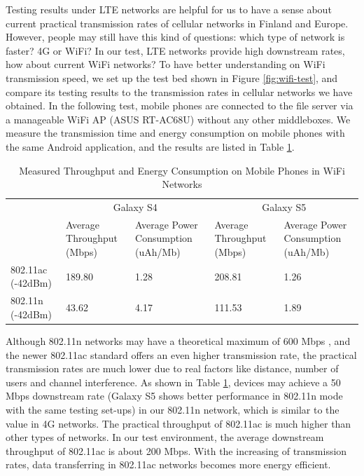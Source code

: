 \documentclass[english]{tktltiki}
\begin{document}
Testing results under LTE networks are helpful for us to have a sense about current practical transmission rates of cellular networks in Finland and Europe. However, people may still have this kind of questions: which type of network is faster? 4G or WiFi? In our test, LTE networks provide high downstream rates, how about current WiFi networks? To have better understanding on WiFi transmission speed, we set up the test bed shown in Figure \ref{fig:wifi-test}, and compare its testing results to the transmission rates in cellular networks we have obtained. In the following test, mobile phones are connected to the file server via a manageable WiFi AP (ASUS RT-AC68U) without any other middleboxes. We measure the transmission time and energy consumption on mobile phones with the same Android application, and the results are listed in Table \ref{tab:wifi-speed}.

\begin{table}[htbp]
\centering
\begin{tabular}{|p{110pt}|p{50pt}|p{75pt}|p{50pt}|p{75pt}|}
  \hline
  & \multicolumn{2}{c|}{Galaxy S4} & \multicolumn{2}{c|}{Galaxy S5}\\
  \cline{2-5}
  & Average Throughput (Mbps) & Average Power Consumption (uAh/Mb) & Average Throughput (Mbps) & Average Power Consumption (uAh/Mb) \\
  \hline
  802.11ac (-42dBm\footnotemark[8]) & 189.80 & 1.28 & 208.81 & 1.26 \\
  \hline
  802.11n (-42dBm\footnotemark[8]) & 43.62 & 4.17 & 111.53 & 1.89 \\
  \hline
\end{tabular}
\caption{Measured Throughput and Energy Consumption on Mobile Phones in WiFi Networks}
\label{tab:wifi-speed}
\end{table}



Although 802.11n networks may have a theoretical maximum of 600 Mbps \cite{80211n}, and the newer 802.11ac standard offers an even higher transmission rate, the practical transmission rates are much lower due to real factors like distance, number of users and channel interference. As shown in Table \ref{tab:wifi-speed}, devices may achieve a 50 Mbps downstream rate (Galaxy S5 shows better performance in 802.11n mode with the same testing set-ups) in our 802.11n network, which is similar to the value in 4G networks. The practical throughput of 802.11ac is much higher than other types of networks. In our test environment, the average downstream throughput of 802.11ac is about 200 Mbps. With the increasing of transmission rates, data transferring in 802.11ac networks becomes more energy efficient.
\end{document}
